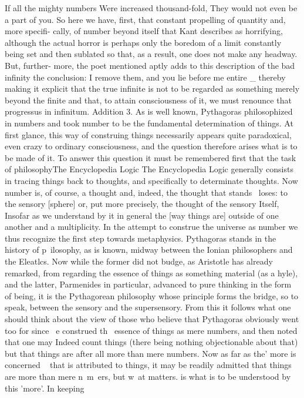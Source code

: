 {{If all the mighty numbers
Were increased thousand-fold,
They would not even be a part of you.
So here we have, first, that constant propelling of quantity and, more specifi-
cally, of number beyond itself that Kant describes as horrifying, although the
actual horror is perhaps only the boredom of a limit constantly being set and
then sublated so that, as a result, one does not make any headway. But, further-
more, the poet mentioned aptly adds to this description of the bad infinity the
conclusion:
I remove them, and you lie before me entire
_ thereby making it explicit that the true infinite is not to be regarded as something
merely beyond the finite and that, to attain consciousness of it, we must renounce
that progressus in infinitum.
Addition 3. As is well known, Pythagoras philosophized in numbers and took
number to be the fundamental determination of things. At first glance, this way
of construing things necessarily appears quite paradoxical, even crazy to ordinary
consciousness, and the question therefore arises what is to be made of it. To
answer this question it must be remembered first that the task of philosophyThe Encyclopedia Logic The Encyclopedia Logic
generally consists in tracing things back to thoughts, and specifically to determinate
thoughts. Now number is, of course, a thought and, indeed, the thought that stands
~loses: to the sensory [sphere] or, put more precisely, the thought of the sensory
Itself, Insofar as we understand by it in general the [way things are] outside of one
another and a multiplicity. In the attempt to construe the universe as number we
thus recognize the first step towards metaphysics. Pythagoras stands in the history
of p~ilosophy, as is known, midway between the Ionian philosophers and the
Eleatlcs. Now while the former did not budge, as Aristotle has already remarked,
from regarding the essence of things as something material (as a hyle), and the latter,
Parmenides in particular, advanced to pure thinking in the form of being, it is the
Pythagorean philosophy whose principle forms the bridge, so to speak, between
the sensory and the supersensory. From this it follows what one should think
about the view of those who believe that Pythagoras obviously went too for since
~e construed th~ essence of things as mere numbers, and then noted that one may
Indeed count things (there being nothing objectionable about that) but that things
are after all more than mere numbers. Now as far as the' more is concerned ~ that
is attributed to things, it may be readily admitted that things are more than mere
n~m~ers, but w~at matters. is what is to be understood by this 'more'. In keeping
}}
